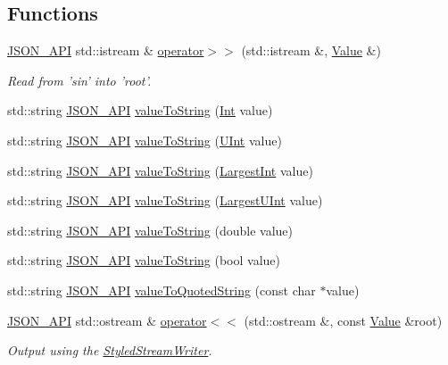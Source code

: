 \subsection*{Functions}
\begin{DoxyCompactItemize}
\item 
\hyperlink{json_8hpp_a1d61ffde86ce1a18fd83194ff0d9a206}{J\-S\-O\-N\-\_\-\-A\-P\-I} std\-::istream \& \hyperlink{namespace_json_a4d245ef719cc0853e8e78eb5f99c16e5}{operator$>$$>$} (std\-::istream \&, \hyperlink{class_json_1_1_value}{Value} \&)
\begin{DoxyCompactList}\small\item\em Read from 'sin' into 'root'. \end{DoxyCompactList}\item 
std\-::string \hyperlink{json_8hpp_a1d61ffde86ce1a18fd83194ff0d9a206}{J\-S\-O\-N\-\_\-\-A\-P\-I} \hyperlink{namespace_json_a05cd078d8e086a4bcc08d40948f711e7}{value\-To\-String} (\hyperlink{namespace_json_a08122e8005b706d982e48cca1e2119c7}{Int} value)
\item 
std\-::string \hyperlink{json_8hpp_a1d61ffde86ce1a18fd83194ff0d9a206}{J\-S\-O\-N\-\_\-\-A\-P\-I} \hyperlink{namespace_json_abcb58ea0f384c30608729a94d539e2ce}{value\-To\-String} (\hyperlink{namespace_json_a800fb90eb6ee8d5d62b600c06f87f7d4}{U\-Int} value)
\item 
std\-::string \hyperlink{json_8hpp_a1d61ffde86ce1a18fd83194ff0d9a206}{J\-S\-O\-N\-\_\-\-A\-P\-I} \hyperlink{namespace_json_abd9c650f70d9434f98f9025e2e2faf2d}{value\-To\-String} (\hyperlink{namespace_json_a218d880af853ce786cd985e82571d297}{Largest\-Int} value)
\item 
std\-::string \hyperlink{json_8hpp_a1d61ffde86ce1a18fd83194ff0d9a206}{J\-S\-O\-N\-\_\-\-A\-P\-I} \hyperlink{namespace_json_a3f46b0bc62b95a9426a2da0117bdf9f0}{value\-To\-String} (\hyperlink{namespace_json_ae202ecad69725e23443f465e257456d0}{Largest\-U\-Int} value)
\item 
std\-::string \hyperlink{json_8hpp_a1d61ffde86ce1a18fd83194ff0d9a206}{J\-S\-O\-N\-\_\-\-A\-P\-I} \hyperlink{namespace_json_a99995d7dafa4f4970b349d7d3c8d1d99}{value\-To\-String} (double value)
\item 
std\-::string \hyperlink{json_8hpp_a1d61ffde86ce1a18fd83194ff0d9a206}{J\-S\-O\-N\-\_\-\-A\-P\-I} \hyperlink{namespace_json_a979ed531f091985e22f0051cd2a8e341}{value\-To\-String} (bool value)
\item 
std\-::string \hyperlink{json_8hpp_a1d61ffde86ce1a18fd83194ff0d9a206}{J\-S\-O\-N\-\_\-\-A\-P\-I} \hyperlink{namespace_json_aa0c8235a4a5c6599da5d3332743db8ac}{value\-To\-Quoted\-String} (const char $\ast$value)
\item 
\hyperlink{json_8hpp_a1d61ffde86ce1a18fd83194ff0d9a206}{J\-S\-O\-N\-\_\-\-A\-P\-I} std\-::ostream \& \hyperlink{namespace_json_a87bc83d7e90fc666d28aa16727deda2f}{operator$<$$<$} (std\-::ostream \&, const \hyperlink{class_json_1_1_value}{Value} \&root)
\begin{DoxyCompactList}\small\item\em Output using the \hyperlink{class_json_1_1_styled_stream_writer}{Styled\-Stream\-Writer}. \end{DoxyCompactList}\end{DoxyCompactItemize}
